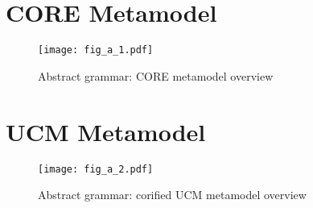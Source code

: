 \section{CORE Metamodel}

\begin{figure}[h]
	\centering
	\texttt{[image: fig\_a\_1.pdf]}
	\caption{Abstract grammar: CORE metamodel overview}
	\label{fig:a.1}
\end{figure}

\section{UCM Metamodel}

\begin{figure}[h]
	\centering
	\texttt{[image: fig\_a\_2.pdf]}
	\caption{Abstract grammar: corified UCM metamodel overview}
	\label{fig:a.2}
\end{figure}
